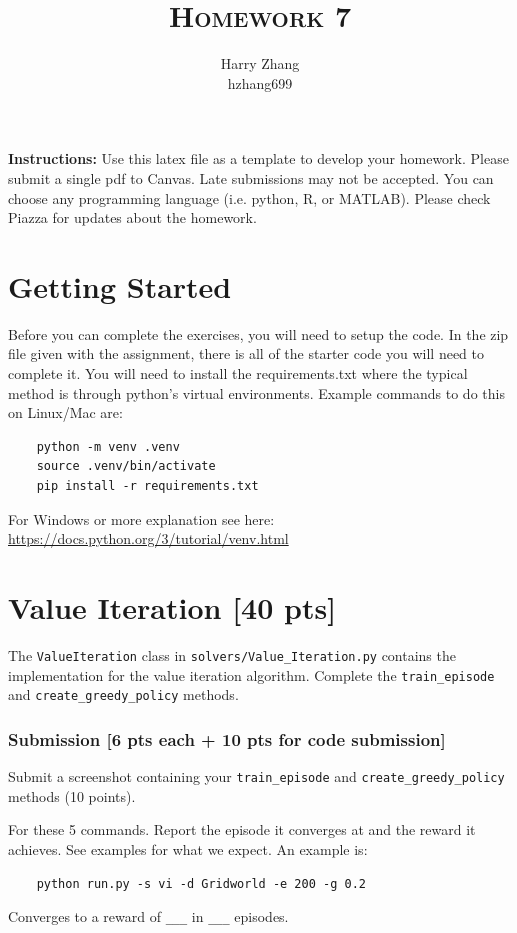 \documentclass[a4paper]{article}
\title{\textsc{Homework 7}} %
\author{
Harry Zhang \\
hzhang699\\
}
\date{}
\theoremstyle{definition}
\begin{document}
\maketitle 

\textbf{Instructions:}
Use this latex file as a template to develop your homework. Please submit a single pdf to Canvas. Late submissions may not be accepted. You can choose any programming language (i.e. python, R, or MATLAB). Please check Piazza for updates about the homework.
\vspace{0.1in}

\section{Getting Started}
Before you can complete the exercises, you will need to setup the code.
%
In the zip file given with the assignment, there is all of the starter code you will need to complete it.
%
You will need to install the requirements.txt where the typical method is through python's virtual environments.
%
Example commands to do this on Linux/Mac are:
\begin{verbatim}
    python -m venv .venv
    source .venv/bin/activate
    pip install -r requirements.txt 
\end{verbatim}
%

For Windows or more explanation see here: \url{https://docs.python.org/3/tutorial/venv.html}

\section{Value Iteration [40 pts]}

The \verb|ValueIteration| class in \verb|solvers/Value_Iteration.py| contains the implementation for the value iteration algorithm. Complete the \verb|train_episode| and \verb|create_greedy_policy| methods.

\subsubsection*{Submission [6 pts each + 10 pts for code submission]}

Submit a screenshot containing your \verb|train_episode| and \verb|create_greedy_policy| methods (10 points). 

\vspace{5mm}
For these 5 commands. Report the episode it converges at and the reward it achieves. See examples for what we expect. An example is: \begin{verbatim}
    python run.py -s vi -d Gridworld -e 200 -g 0.2
\end{verbatim}
Converges to a reward of \verb|___| in \verb|___| episodes.
\end{document}
